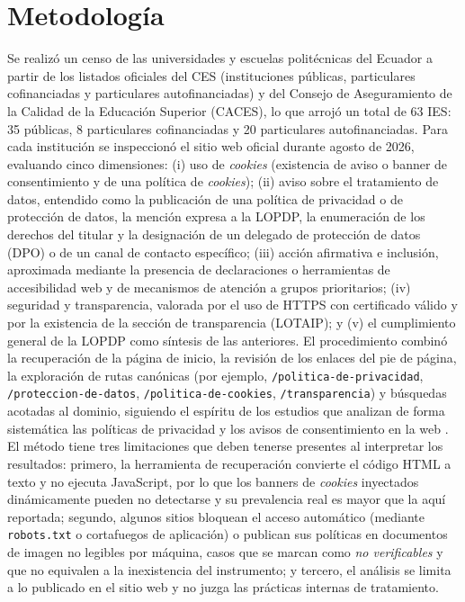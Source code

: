 \documentclass[11pt,a4paper]{article}
\begin{document}
\section{Metodolog\'ia}
Se realiz\'o un censo de las universidades y escuelas polit\'ecnicas del Ecuador a partir de los listados oficiales del CES (instituciones p\'ublicas, particulares cofinanciadas y particulares autofinanciadas) y del Consejo de Aseguramiento de la Calidad de la Educaci\'on Superior (CACES), lo que arroj\'o un total de 63 IES: 35 p\'ublicas, 8 particulares cofinanciadas y 20 particulares autofinanciadas.
Para cada instituci\'on se inspeccion\'o el sitio web oficial durante agosto de 2026, evaluando cinco dimensiones: (i) uso de \emph{cookies} (existencia de aviso o banner de consentimiento y de una pol\'itica de \emph{cookies}); (ii) aviso sobre el tratamiento de datos, entendido como la publicaci\'on de una pol\'itica de privacidad o de protecci\'on de datos, la menci\'on expresa a la LOPDP, la enumeraci\'on de los derechos del titular y la designaci\'on de un delegado de protecci\'on de datos (DPO) o de un canal de contacto espec\'ifico; (iii) acci\'on afirmativa e inclusi\'on, aproximada mediante la presencia de declaraciones o herramientas de accesibilidad web y de mecanismos de atenci\'on a grupos prioritarios; (iv) seguridad y transparencia, valorada por el uso de HTTPS con certificado v\'alido y por la existencia de la secci\'on de transparencia (LOTAIP); y (v) el cumplimiento general de la LOPDP como s\'intesis de las anteriores.
El procedimiento combin\'o la recuperaci\'on de la p\'agina de inicio, la revisi\'on de los enlaces del pie de p\'agina, la exploraci\'on de rutas can\'onicas (por ejemplo, \texttt{/politica-de-privacidad}, \texttt{/proteccion-de-datos}, \texttt{/politica-de-cookies}, \texttt{/transparencia}) y b\'usquedas acotadas al dominio, siguiendo el esp\'iritu de los estudios que analizan de forma sistem\'atica las pol\'iticas de privacidad y los avisos de consentimiento en la web \citep{fabian2017largescale,belcheva2023understanding,nouwens2020dark,habib2022okay}.
El m\'etodo tiene tres limitaciones que deben tenerse presentes al interpretar los resultados: primero, la herramienta de recuperaci\'on convierte el c\'odigo HTML a texto y no ejecuta JavaScript, por lo que los banners de \emph{cookies} inyectados din\'amicamente pueden no detectarse y su prevalencia real es mayor que la aqu\'i reportada; segundo, algunos sitios bloquean el acceso autom\'atico (mediante \texttt{robots.txt} o cortafuegos de aplicaci\'on) o publican sus pol\'iticas en documentos de imagen no legibles por m\'aquina, casos que se marcan como \emph{no verificables} y que no equivalen a la inexistencia del instrumento; y tercero, el an\'alisis se limita a lo publicado en el sitio web y no juzga las pr\'acticas internas de tratamiento.
\end{document}
